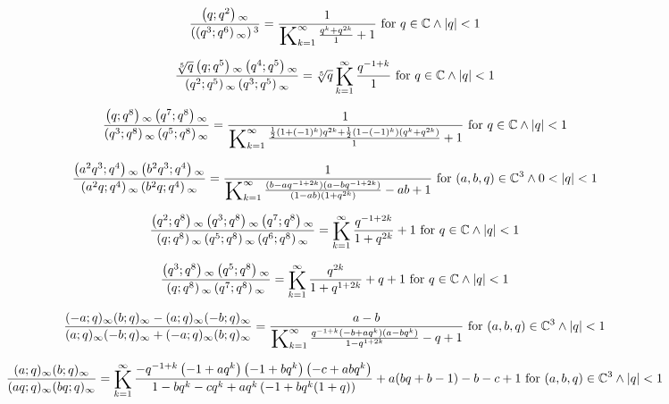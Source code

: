 \documentclass{article}
\newcommand{\bigK}{\mathop{\raisebox{-5pt}{\huge K}}}
\begin{document}
\[\frac{\left(q;q^2\right){}_{\infty }}{\left(\left(q^3;q^6\right){}_{\infty }\right){}^3}=\frac{1}{\bigK_{k=1}^{\infty}\frac{q^k+q^{2 k}}{1}+1}\text{ for }q\in \mathbb{C}\land \left| q\right| <1\] 

\[\frac{\sqrt[5]{q} \left(q;q^5\right){}_{\infty } \left(q^4;q^5\right){}_{\infty }}{\left(q^2;q^5\right){}_{\infty } \left(q^3;q^5\right){}_{\infty }}=\sqrt[5]{q} \bigK_{k=1}^{\infty}\frac{q^{-1+k}}{1}\text{ for }q\in \mathbb{C}\land \left| q\right| <1\] 

\[\frac{\left(q;q^8\right){}_{\infty } \left(q^7;q^8\right){}_{\infty }}{\left(q^3;q^8\right){}_{\infty } \left(q^5;q^8\right){}_{\infty }}=\frac{1}{\bigK_{k=1}^{\infty}\frac{\frac{1}{2} \left(1+(-1)^k\right) q^{2 k}+\frac{1}{2} \left(1-(-1)^k\right) \left(q^k+q^{2 k}\right)}{1}+1}\text{ for }q\in \mathbb{C}\land \left| q\right| <1\] 

\[\frac{\left(a^2 q^3;q^4\right){}_{\infty } \left(b^2 q^3;q^4\right){}_{\infty }}{\left(a^2 q;q^4\right){}_{\infty } \left(b^2 q;q^4\right){}_{\infty }}=\frac{1}{\bigK_{k=1}^{\infty}\frac{\left(b-a q^{-1+2 k}\right) \left(a-b q^{-1+2 k}\right)}{(1-a b) \left(1+q^{2 k}\right)}-a b+1}\text{ for }(a,b,q)\in \mathbb{C}^3\land 0<\left| q\right| <1\] 

\[\frac{\left(q^2;q^8\right){}_{\infty } \left(q^3;q^8\right){}_{\infty } \left(q^7;q^8\right){}_{\infty }}{\left(q;q^8\right){}_{\infty } \left(q^5;q^8\right){}_{\infty } \left(q^6;q^8\right){}_{\infty }}=\bigK_{k=1}^{\infty}\frac{q^{-1+2 k}}{1+q^{2 k}}+1\text{ for }q\in \mathbb{C}\land \left| q\right| <1\] 

\[\frac{\left(q^3;q^8\right){}_{\infty } \left(q^5;q^8\right){}_{\infty }}{\left(q;q^8\right){}_{\infty } \left(q^7;q^8\right){}_{\infty }}=\bigK_{k=1}^{\infty}\frac{q^{2 k}}{1+q^{1+2 k}}+q+1\text{ for }q\in \mathbb{C}\land \left| q\right| <1\] 

\[\frac{(-a;q)_{\infty } (b;q)_{\infty }-(a;q)_{\infty } (-b;q)_{\infty }}{(a;q)_{\infty } (-b;q)_{\infty }+(-a;q)_{\infty } (b;q)_{\infty }}=\frac{a-b}{\bigK_{k=1}^{\infty}\frac{q^{-1+k} \left(-b+a q^k\right) \left(a-b q^k\right)}{1-q^{1+2 k}}-q+1}\text{ for }(a,b,q)\in \mathbb{C}^3\land \left| q\right| <1\] 

\[\frac{(a;q)_{\infty } (b;q)_{\infty }}{(a q;q)_{\infty } (b q;q)_{\infty }}=\bigK_{k=1}^{\infty}\frac{-q^{-1+k} \left(-1+a q^k\right) \left(-1+b q^k\right) \left(-c+a b q^k\right)}{1-b q^k-c q^k+a q^k \left(-1+b q^k (1+q)\right)}+a (b q+b-1)-b-c+1\text{ for }(a,b,q)\in \mathbb{C}^3\land \left| q\right| <1\] 
\end{document}
